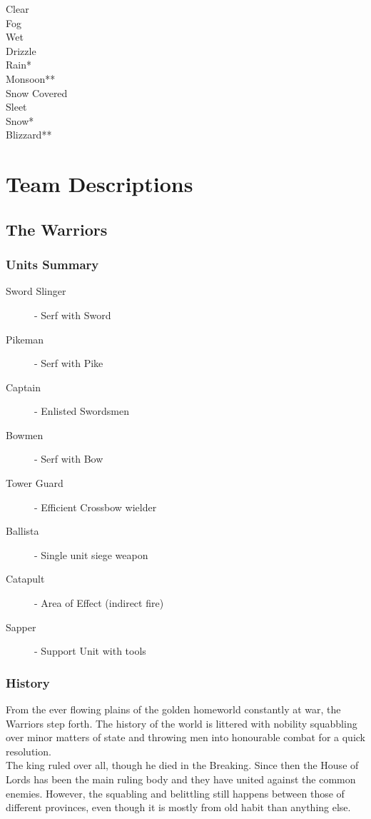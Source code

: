 \documentclass[a4paper]{article}
\begin{document}
Clear\\
Fog\\

Wet\\
Drizzle\\
Rain*\\
Monsoon**\\

Snow Covered\\
Sleet\\
Snow*\\
Blizzard**\\



\newpage \section{Team Descriptions}

\subsection{The Warriors}

\subsubsection{Units Summary}

\begin{description}
\item[Sword Slinger]- Serf with Sword
\item[Pikeman]- Serf with Pike
\item[Captain]- Enlisted Swordsmen

\item[Bowmen]- Serf with Bow
\item[Tower Guard]- Efficient Crossbow wielder

\item[Ballista]- Single unit siege weapon
\item[Catapult]- Area of Effect (indirect fire)

\item[Sapper]- Support Unit with tools
\end{description}

\subsubsection{History}

From the ever flowing plains of the golden homeworld constantly at war, the Warriors step forth. The history of the world is littered with nobility squabbling over minor matters of state and throwing men into honourable combat for a quick resolution.\\
The king ruled over all, though he died in the Breaking. Since then the House of Lords has been the main ruling body and they have united against the common enemies. However, the squabling and belittling still happens between those of different provinces, even though it is mostly from old habit than anything else.
\end{document}
